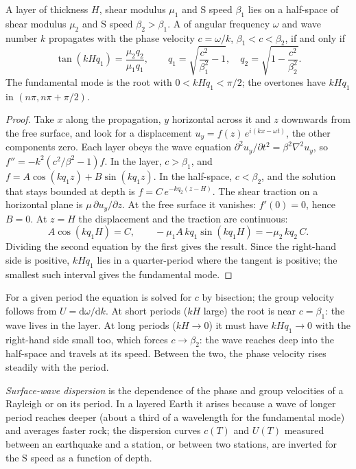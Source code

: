 \begin{theorem}\label{thm:b3:seismology-imaging:love}
A layer of thickness $H$, shear modulus $\mu_1$ and S speed $\beta_1$ lies on a
half-space of shear modulus $\mu_2$ and S speed $\beta_2 > \beta_1$. A  of angular frequency $\omega$ and wave number $k$ propagates with the
phase velocity $c = \omega/k$, $\beta_1 < c < \beta_2$, if and only if
\[
  \tan\!\left(kH q_1\right) = \frac{\mu_2 q_2}{\mu_1 q_1},
  \qquad q_1 = \sqrt{\frac{c^2}{\beta_1^2} - 1},\quad
  q_2 = \sqrt{1 - \frac{c^2}{\beta_2^2}} .
\]
The fundamental mode is the root with $0 < kHq_1 < \pi/2$; the overtones have
$kHq_1$ in $(n\pi, n\pi + \pi/2)$.
\end{theorem}

\begin{proof}
Take $x$ along the propagation, $y$ horizontal across it and $z$ downwards from
the free surface, and look for a displacement
$u_y = f(z)\,e^{i(kx - \omega t)}$, the other components zero. Each layer
obeys the wave equation $\partial^2 u_y/\partial t^2 = \beta^2\nabla^2 u_y$, so
$f'' = -k^2\left(c^2/\beta^2 - 1\right) f$. In the layer, $c > \beta_1$, and
$f = A\cos(kq_1z) + B\sin(kq_1z)$. In the half-space, $c < \beta_2$, and the
solution that stays bounded at depth is $f = C\,e^{-kq_2(z - H)}$.
The shear traction on a horizontal plane is $\mu\,\partial u_y/\partial z$.
At the free surface it vanishes: $f'(0) = 0$, hence $B = 0$. At $z = H$ the
displacement and the traction are continuous:
\[
  A\cos(kq_1H) = C, \qquad -\mu_1 A\,kq_1\sin(kq_1H) = -\mu_2\,kq_2\,C .
\]
Dividing the second equation by the first gives the result. Since the
right-hand side is positive, $kHq_1$ lies in a quarter-period where the
tangent is positive; the smallest such interval gives the fundamental mode.
\end{proof}

For a given period the equation is solved for $c$ by bisection; the group
velocity follows from $U = \mathrm d\omega/\mathrm dk$. At short periods
($kH$ large) the root is near $c = \beta_1$: the wave lives in the layer. At
long periods ($kH \to 0$) it must have $kHq_1 \to 0$ with the right-hand side
small too, which forces $c \to \beta_2$: the wave reaches deep into the
half-space and travels at its speed. Between the two, the phase velocity rises
steadily with the period.

\begin{definition}\label{def:b3:seismology-imaging:dispersion}
\emph{Surface-wave dispersion} is the dependence
of the phase and group velocities of a Rayleigh or  on its period. In
a layered Earth it arises because a wave of longer period reaches deeper
(about a third of a wavelength for the fundamental mode) and averages faster
rock; the dispersion curves $c(T)$ and $U(T)$ measured between an earthquake
and a station, or between two stations, are inverted for the S speed as a
function of depth.
\end{definition}


